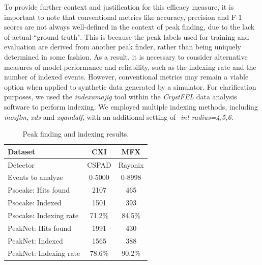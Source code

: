 \documentclass[conference]{IEEEtran}
\newcommand{\peaknet}{PeakNet}
\newcommand{\psocake}{Psocake}
\begin{document}
To provide further context and justification for this efficacy measure, it is
important to note that conventional metrics like accuracy, precision and F-1
scores are not always well-defined in the context of peak finding, due to the
lack of actual ``ground truth".  This is because the peak labels used for
training and evaluation are derived from another peak finder, rather than being
uniquely determined in some fashion.  As a result, it is necessary to consider
alternative measures of model performance and reliability, such as the indexing
rate and the number of indexed events.  However, 
conventional metrics may remain a viable option when applied to synthetic data
generated by a simulator.   For clarification purposes, we used the \textit{indexamajig} tool within the \textit{CrystFEL} data analysis software \citep{whiteCrystFELSoftwareSuite2012} to perform indexing.  We employed multiple indexing methods, including \textit{mosflm}, \textit{xds} and \textit{xgandalf}, with an additional setting of \textit{-int-radius=4,5,6}.   

\begin{table}[htbp]
\caption{
    Peak finding and indexing results.
}
\label{tb : perf}
\centering
\begin{tabular}{ | l || c | c | }
    \hline
    Dataset           &  CXI   & MFX\\
    \hline
    Detector          & CSPAD  & Rayonix \\
    Events to analyze & 0-5000 & 0-8998 \\
    \hline
    \psocake{}: Hits found         &  2107   & 465  \\
    \psocake{}: Indexed       &  1501   & 393  \\
    \psocake{}: Indexing rate &  71.2\% & 84.5\% \\
    \hline
    \peaknet{}: Hits found         &  1991   & 430  \\
    \peaknet{}: Indexed       &  1565   & 388  \\
    \peaknet{}: Indexing rate &  78.6\% & 90.2\% \\
    \hline
\end{tabular}
\end{table}
\end{document}
